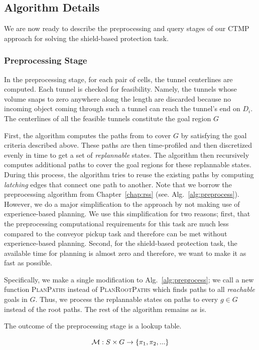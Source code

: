 \documentclass[a4paper]{report}
\begin{document}
\subsection{Algorithm Details}
We are now ready to describe the preprocessing and query stages of our CTMP approach for solving the shield-based protection task.

\subsubsection{Preprocessing Stage}
In the preprocessing stage, for each pair of cells, the tunnel centerlines are computed. Each tunnel is checked for feasibility. Namely, the tunnels whose volume snaps to zero anywhere along the length are discarded because no incoming object coming through such a tunnel can reach the tunnel's end on $D_i$. The centerlines of all the feasible tunnels constitute the goal region $G$

First, the algorithm computes the paths from \Shome to cover $G$ by satisfying the goal criteria described above. These paths are then time-profiled and then discretized evenly in time to get a set of \emph{replannable} states. The algorithm then recursively computes additional paths to cover the goal regions for these replannable states. During this process, the algorithm tries to reuse the existing paths by computing \emph{latching} edges that connect one path to another. Note that we borrow the preprocessing algorithm from Chapter~\ref{chap:rss} (see. Alg.~\ref{alg:preprocess}). However, we do a major simplification to the approach by not making use of experience-based planning. We use this simplification for two reasons; first, that the preprocessing computational requirements for this task are much less compared to the conveyor pickup task and therefore can be met without experience-based planning. Second, for the shield-based protection task, the available time for planning is almost zero and therefore, we want to make it as fast as possible.

Specifically, we make a single modification to Alg.~\ref{alg:preprocess}; we call a new function \textsc{PlanPaths} instead of \textsc{PlanRootPaths} which finds paths to all \emph{reachable} goals in $G$. Thus, we process the replannable states on paths to every $g \in G$ instead of the root paths. The rest of the algorithm remains as is.

The outcome of the preprocessing stage is a lookup table.

$$
\mathcal{M} : S \times G \rightarrow \{\pi_1, \pi_2, ...\}
$$
\end{document}
